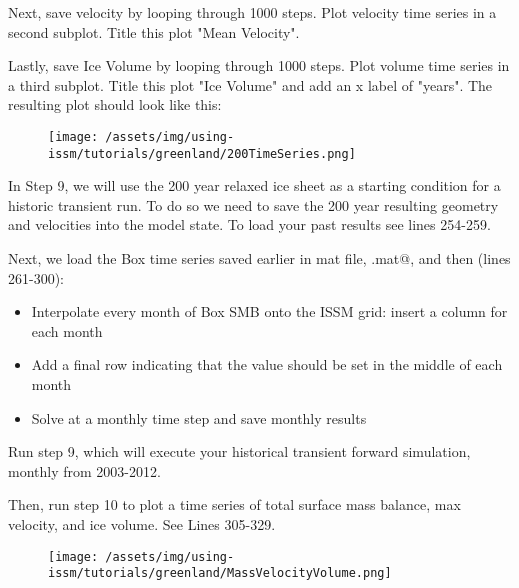 Next, save velocity by looping through 1000 steps. Plot velocity time series in a second subplot. Title this plot "Mean Velocity".

Lastly, save Ice Volume by looping through 1000 steps. Plot volume time series in a third subplot. Title this plot "Ice Volume" and add an x label of "years". The resulting plot should look like this:

\begin{figure}[H]
	\begin{center}
		\texttt{[image: /assets/img/using-issm/tutorials/greenland/200TimeSeries.png]}
	\end{center}
\end{figure}

In Step 9, we will use the 200 year relaxed ice sheet as a starting condition for a historic transient run. To do so we need to save the 200 year resulting geometry and velocities into the model state. To load your past results see lines 254-259.

Next, we load the Box time series saved earlier in mat file, \verb@smbbox.mat@, and then (lines 261-300):
\begin{itemize}
	\item Interpolate every month of Box SMB onto the ISSM grid: insert a column for each month
	\item Add a final row indicating that the value should be set in the middle of each month
	\item Solve at a monthly time step and save monthly results
\end{itemize}

Run step 9, which will execute your historical transient forward simulation, monthly from 2003-2012.

Then, run step 10 to plot a time series of total surface mass balance, max velocity, and ice volume. See Lines 305-329.

\begin{figure}[H]
	\begin{center}
		\texttt{[image: /assets/img/using-issm/tutorials/greenland/MassVelocityVolume.png]}
	\end{center}
\end{figure}

